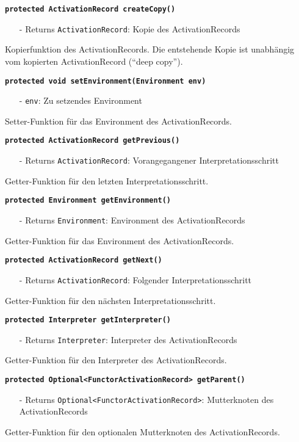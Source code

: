 \documentclass[parskip=full,11pt,twoside]{scrartcl}
\begin{document}
\textbf{\texttt{protected ActivationRecord createCopy()}}
\begin{itemize}[noitemsep]
	\item[-] Returns \texttt{ActivationRecord}: Kopie des ActivationRecords
\end{itemize}
Kopierfunktion des ActivationRecords. Die entstehende Kopie ist unabhängig vom kopierten ActivationRecord (\enquote{deep copy}).

\textbf{\texttt{protected void setEnvironment(Environment env)}}
\begin{itemize}[noitemsep]
	\item[-] \texttt{env}: Zu setzendes Environment
\end{itemize}
Setter-Funktion für das Environment des ActivationRecords.

\textbf{\texttt{protected ActivationRecord getPrevious()}}
\begin{itemize}[noitemsep]
	\item[-] Returns \texttt{ActivationRecord}: Vorangegangener Interpretationsschritt
\end{itemize}
Getter-Funktion für den letzten Interpretationsschritt.

\textbf{\texttt{protected Environment getEnvironment()}}
\begin{itemize}[noitemsep]
	\item[-] Returns \texttt{Environment}: Environment des ActivationRecords
\end{itemize}
Getter-Funktion für das Environment des ActivationRecords.

\textbf{\texttt{protected ActivationRecord getNext()}}
\begin{itemize}[noitemsep]
	\item[-] Returns \texttt{ActivationRecord}: Folgender Interpretationsschritt
\end{itemize}
Getter-Funktion für den nächsten Interpretationsschritt.

\textbf{\texttt{protected Interpreter getInterpreter()}}
\begin{itemize}[noitemsep]
	\item[-] Returns \texttt{Interpreter}: Interpreter des ActivationRecords
\end{itemize}
Getter-Funktion für den Interpreter des ActivationRecords.

\textbf{\texttt{protected Optional<FunctorActivationRecord> getParent()}}
\begin{itemize}[noitemsep]
	\item[-] Returns \texttt{Optional<FunctorActivationRecord>}: Mutterknoten des ActivationRecords
\end{itemize}
Getter-Funktion für den optionalen Mutterknoten des ActivationRecords.
\end{document}
